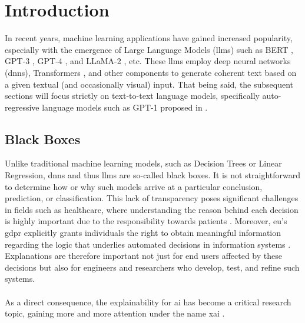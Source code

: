 \chapter{Introduction} \label{cha:introduction}


In recent years, machine learning applications have gained increased popularity, especially with the emergence of Large Language Models (\acrshort{llm}s) such as BERT \cite{devlin2019bertpretrainingdeepbidirectional}, GPT-3 \cite{brown2020languagemodelsfewshotlearners}, GPT-4 \cite{openai_2023}, and LLaMA-2 \cite{touvron2023llama2openfoundation}, etc. These \acrshort{llm}s employ deep neural networks (\acrshort{dnn}s), Transformers \cite{vaswani2023attentionneed}, and other components to generate coherent text based on a given textual (and occasionally visual) input. That being said, the subsequent sections will focus strictly on text-to-text language models, specifically auto-regressive language models such as GPT-1 proposed in \cite{openai_2018_generative_pre_training}.

\section{Black Boxes} \label{sec:black_boxes}
Unlike traditional machine learning models, such as Decision Trees or Linear Regression, \acrshort{dnn}s and thus \acrshort{llm}s are so-called black boxes. It is not straightforward to determine how or why such models arrive at a particular conclusion, prediction, or classification. This lack of transparency poses significant challenges in fields such as healthcare, where understanding the reason behind each decision is highly important due to the responsibility towards patients \cite{xiong2024explainableartificialintelligencexai}. Moreover, \acrshort{eu}'s \acrfull{gdpr} explicitly grants individuals the right to obtain meaningful information regarding the logic that underlies automated decisions in information systems \cite{european_commission_regulation_2016}. Explanations are therefore important not just for end users affected by these decisions but also for engineers and researchers who develop, test, and refine such systems.
\\\\
As a direct consequence, the explainability for \acrfull{ai} has become a critical research topic, gaining more and more attention under the name \acrfull{xai} \cite{https://doi.org/10.1002/widm.1391}.

